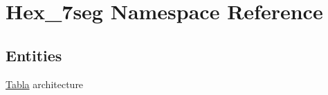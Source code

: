 \hypertarget{namespace_hex__7seg}{}\section{Hex\+\_\+7seg Namespace Reference}
\label{namespace_hex__7seg}
\subsection*{Entities}
\begin{DoxyCompactItemize}
\item 
\hyperlink{class_hex__7seg_1_1_tabla}{Tabla} architecture
\end{DoxyCompactItemize}
